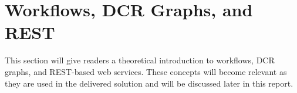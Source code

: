 \section{Workflows, DCR Graphs, and REST}
This section will give readers a theoretical introduction to workflows, DCR graphs, and REST-based web services. These concepts will become relevant as they are used in the delivered solution and will be discussed later in this report.  





